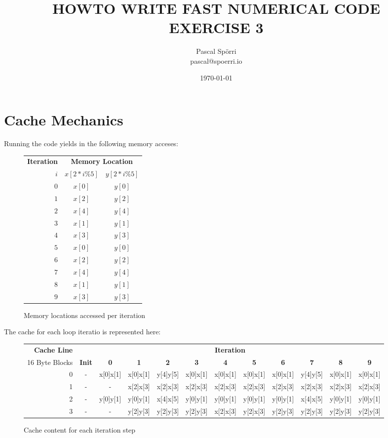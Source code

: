 \documentclass[portrait,a4paper]{article}
\begin{document}
 \author{Pascal Spörri\\pascal@spoerri.io}
 \title{HOWTO WRITE FAST NUMERICAL CODE\\ EXERCISE 3}
 \date{\today}
\maketitle

\section{Cache Mechanics}
Running the code yields in the following memory acceses:

\begin{figure}[H]
    \centering
    \begin{tabular}{r|cc}
    \textbf{Iteration} & \multicolumn{2}{c}{\textbf{Memory Location}}\\
        $i$ & $x[2*i\%5]$ & $y[2*i\%5]$ \\ \hline
        $0$ & $x[0]$ & $y[0]$\\
        $1$ & $x[2]$ & $y[2]$\\
        $2$ & $x[4]$ & $y[4]$\\
        $3$ & $x[1]$ & $y[1]$\\
        $4$ & $x[3]$ & $y[3]$\\
        $5$ & $x[0]$ & $y[0]$\\
        $6$ & $x[2]$ & $y[2]$\\
        $7$ & $x[4]$ & $y[4]$\\
        $8$ & $x[1]$ & $y[1]$\\
        $9$ & $x[3]$ & $y[3]$\\
    \end{tabular}
    \caption{Memory locations accessed per iteration}
\end{figure}

The cache for each loop iteratio is represented here:

\begin{figure}[H]
\hspace{-20mm}
{\small
\begin{tabular}{r|c|c|c|c|c|c|c|c|c|c|c}
\textbf{Cache Line} & \multicolumn{11}{c}{\textbf{Iteration}}\\
16 Byte Blocks & \textbf{Init} & \textbf{0} & \textbf{1} & \textbf{2} & \textbf{3} & \textbf{4} & \textbf{5} & \textbf{6} & \textbf{7} & \textbf{8} & \textbf{9} \\ \hline
0 & - & x[0]x[1]& x[0]x[1] & y[4]y[5] & x[0]x[1] & x[0]x[1] & x[0]x[1] & x[0]x[1] & y[4]y[5] & x[0]x[1] & x[0]x[1]   \\
1 & - & -       & x[2]x[3] & x[2]x[3] & x[2]x[3] & x[2]x[3] & x[2]x[3] & x[2]x[3] & x[2]x[3] & x[2]x[3] & x[2]x[3]  \\
2 & - & y[0]y[1]& y[0]y[1] & x[4]x[5] & y[0]y[1] & y[0]y[1] & y[0]y[1] & y[0]y[1] & x[4]x[5] & y[0]y[1] & y[0]y[1] \\
3 & - & -       & y[2]y[3] & y[2]y[3] & y[2]y[3] & x[2]x[3] & y[2]x[3] & y[2]y[3] & y[2]y[3] & y[2]y[3] & y[2]y[3] \\
\end{tabular}
}
\caption{Cache content for each iteration step}
\end{figure}
\end{document}
